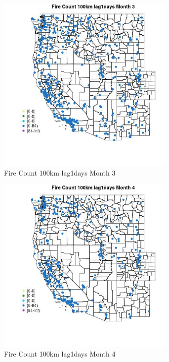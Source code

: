 \begin{figure} 
\centering  
\includegraphics[width=0.77\textwidth]{Code_Outputs/Report_ML_input_PM25_Step4_part_e_de_duplicated_aves_compiled_2019-05-18wNAs_MapObsMo3Fire_Count_100km_lag1days.jpg} 
\caption{\label{fig:Report_ML_input_PM25_Step4_part_e_de_duplicated_aves_compiled_2019-05-18wNAsMapObsMo3Fire_Count_100km_lag1days}Fire Count 100km lag1days Month 3} 
\end{figure} 
 

\clearpage 

\begin{figure} 
\centering  
\includegraphics[width=0.77\textwidth]{Code_Outputs/Report_ML_input_PM25_Step4_part_e_de_duplicated_aves_compiled_2019-05-18wNAs_MapObsMo4Fire_Count_100km_lag1days.jpg} 
\caption{\label{fig:Report_ML_input_PM25_Step4_part_e_de_duplicated_aves_compiled_2019-05-18wNAsMapObsMo4Fire_Count_100km_lag1days}Fire Count 100km lag1days Month 4} 
\end{figure} 
 

